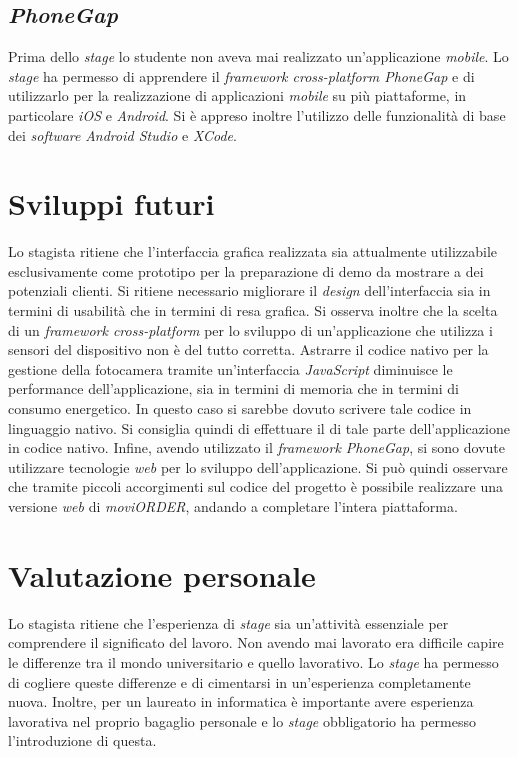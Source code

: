 \subsection{\textit{PhoneGap}}

Prima dello \textit{stage} lo studente non aveva mai realizzato un'applicazione \textit{mobile}. Lo \textit{stage} ha permesso di apprendere il \textit{framework cross-platform PhoneGap} e di utilizzarlo per la realizzazione di applicazioni \textit{mobile} su più piattaforme, in particolare \textit{iOS} e \textit{Android}. Si è appreso inoltre l'utilizzo delle funzionalità di base dei \textit{software} \textit{Android Studio} e \textit{XCode}.

\section{Sviluppi futuri}

Lo stagista ritiene che l'interfaccia grafica realizzata sia attualmente utilizzabile esclusivamente come prototipo per la preparazione di demo da mostrare a dei potenziali clienti. Si ritiene necessario migliorare il \textit{design} dell'interfaccia sia in termini di usabilità che in termini di resa grafica. 
Si osserva inoltre che la scelta di un \textit{framework cross-platform} per lo sviluppo di un'applicazione che utilizza i sensori del dispositivo non è del tutto corretta. Astrarre il codice nativo per la gestione della fotocamera tramite un'interfaccia \textit{JavaScript} diminuisce le performance dell'applicazione, sia in termini di memoria che in termini di consumo energetico. In questo caso si sarebbe dovuto scrivere tale codice in linguaggio nativo. Si consiglia quindi di effettuare il  di tale parte dell'applicazione in codice nativo.
Infine, avendo utilizzato il \textit{framework PhoneGap}, si sono dovute utilizzare tecnologie \textit{web} per lo sviluppo dell'applicazione. Si può quindi osservare che tramite piccoli accorgimenti sul codice del progetto è possibile realizzare una versione \textit{web} di \textit{moviORDER}, andando a completare l'intera piattaforma.

\section{Valutazione personale}

Lo stagista ritiene che l'esperienza di \textit{stage} sia un'attività essenziale per comprendere il significato del lavoro. Non avendo mai lavorato era difficile capire le differenze tra il mondo universitario e quello lavorativo. Lo \textit{stage} ha permesso di cogliere queste differenze e di cimentarsi in un'esperienza completamente nuova. Inoltre, per un laureato in informatica è importante avere esperienza lavorativa nel proprio bagaglio personale e lo \textit{stage} obbligatorio ha permesso l'introduzione di questa.

